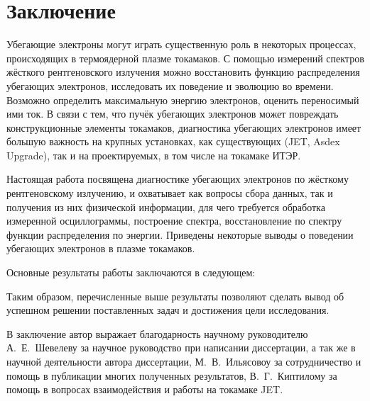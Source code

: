 \chapter*{Заключение}                       %


Убегающие электроны могут играть существенную роль в некоторых процессах, происходящих в термоядерной плазме токамаков. С помощью измерений спектров жёсткого рентгеновского излучения можно восстановить функцию распределения убегающих электронов, исследовать их поведение и эволюцию во времени. Возможно определить максимальную энергию электронов, оценить переносимый ими ток. В связи с тем, что пучёк убегающих электронов может повреждать конструкционные элементы токамаков, диагностика убегающих электронов имеет большую важность на крупных установках, как существующих (JET, Asdex Upgrade), так и на проектируемых, в том числе на токамаке ИТЭР. 

Настоящая работа посвящена диагностике убегающих электронов по жёсткому рентгеновскому излучению, и охватывает как вопросы сбора данных, так и получения из них физической информации, для чего требуется обработка измеренной осциллограммы, построение спектра, восстановление по спектру функции распределения по энергии. Приведены некоторые выводы о поведении убегающих электронов в плазме токамаков.

Основные результаты работы заключаются в следующем:



Таким образом, перечисленные выше результаты позволяют сделать вывод об успешном решении поставленных задач и достижения цели исследования.

В заключение автор выражает благодарность научному руководителю А.~Е.~Шевелеву за научное руководство при написании диссертации, а так же в научной деятельности автора диссертации, М.~В.~Ильясовоу за сотрудничество и помощь в публикации многих полученных результатов, В.~Г.~Киптилому за помощь в вопросах взаимодействия и работы на токамаке JET.

